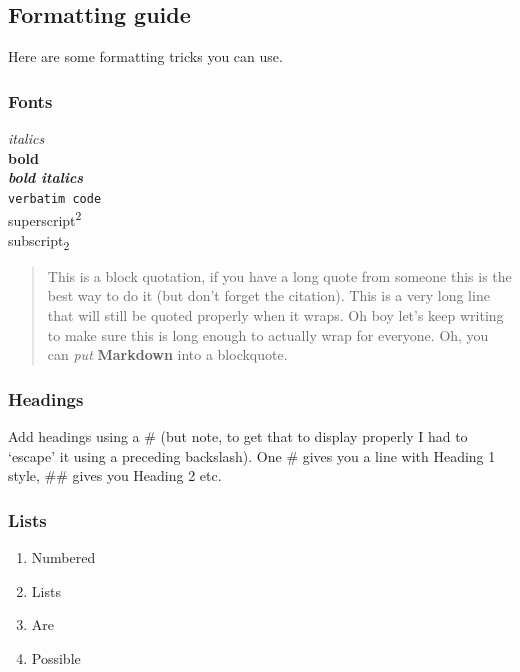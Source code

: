 \documentclass[
]{article}
\providecommand{\tightlist}{%
  \setlength{\itemsep}{0pt}\setlength{\parskip}{0pt}}
\begin{document}
\hypertarget{formatting-guide}{%
\subsection{Formatting guide}\label{formatting-guide}}

Here are some formatting tricks you can use.

\hypertarget{fonts}{%
\subsubsection{Fonts}\label{fonts}}

\emph{italics}\\
\textbf{bold}\\
\textbf{\emph{bold italics}}\\
\texttt{verbatim\ code}~\\
superscript\textsuperscript{2}\\
subscript\textsubscript{2}

\begin{quote}
This is a block quotation, if you have a long quote from someone this is
the best way to do it (but don't forget the citation). This is a very
long line that will still be quoted properly when it wraps. Oh boy let's
keep writing to make sure this is long enough to actually wrap for
everyone. Oh, you can \emph{put} \textbf{Markdown} into a blockquote.
\end{quote}

\hypertarget{headings}{%
\subsubsection{Headings}\label{headings}}

Add headings using a \# (but note, to get that to display properly I had
to `escape' it using a preceding backslash). One \# gives you a line
with Heading 1 style, \#\# gives you Heading 2 etc.

\hypertarget{lists}{%
\subsubsection{Lists}\label{lists}}

\begin{enumerate}
\def\labelenumi{\arabic{enumi}.}
\tightlist
\item
  Numbered
\item
  Lists
\item
  Are
\item
  Possible
\end{enumerate}
\end{document}
